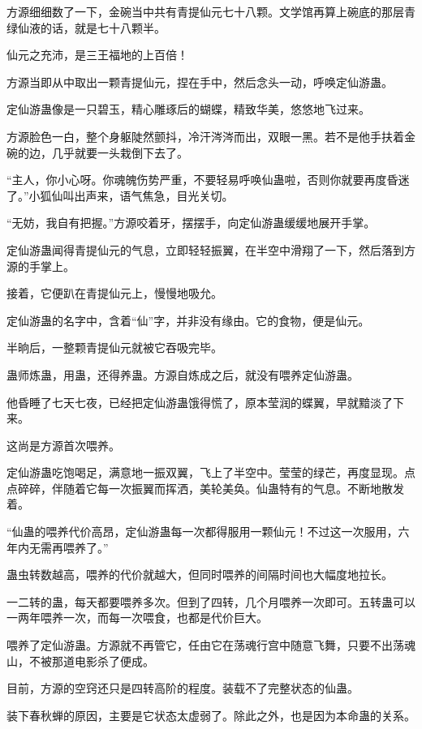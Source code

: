 
\begin{this_body}

方源细细数了一下，金碗当中共有青提仙元七十八颗。文学馆再算上碗底的那层青绿仙液的话，就是七十八颗半。

仙元之充沛，是三王福地的上百倍！

方源当即从中取出一颗青提仙元，捏在手中，然后念头一动，呼唤定仙游蛊。

定仙游蛊像是一只碧玉，精心雕琢后的蝴蝶，精致华美，悠悠地飞过来。

方源脸色一白，整个身躯陡然颤抖，冷汗涔涔而出，双眼一黑。若不是他手扶着金碗的边，几乎就要一头栽倒下去了。

“主人，你小心呀。你魂魄伤势严重，不要轻易呼唤仙蛊啦，否则你就要再度昏迷了。”小狐仙叫出声来，语气焦急，目光关切。

“无妨，我自有把握。”方源咬着牙，摆摆手，向定仙游蛊缓缓地展开手掌。

定仙游蛊闻得青提仙元的气息，立即轻轻振翼，在半空中滑翔了一下，然后落到方源的手掌上。

接着，它便趴在青提仙元上，慢慢地吸允。

定仙游蛊的名字中，含着“仙”字，并非没有缘由。它的食物，便是仙元。

半晌后，一整颗青提仙元就被它吞吸完毕。

蛊师炼蛊，用蛊，还得养蛊。方源自炼成之后，就没有喂养定仙游蛊。

他昏睡了七天七夜，已经把定仙游蛊饿得慌了，原本莹润的蝶翼，早就黯淡了下来。

这尚是方源首次喂养。

定仙游蛊吃饱喝足，满意地一振双翼，飞上了半空中。莹莹的绿芒，再度显现。点点碎碎，伴随着它每一次振翼而挥洒，美轮美奂。仙蛊特有的气息。不断地散发着。

“仙蛊的喂养代价高昂，定仙游蛊每一次都得服用一颗仙元！不过这一次服用，六年内无需再喂养了。”

蛊虫转数越高，喂养的代价就越大，但同时喂养的间隔时间也大幅度地拉长。

一二转的蛊，每天都要喂养多次。但到了四转，几个月喂养一次即可。五转蛊可以一两年喂养一次，而每一次喂食，也都是代价巨大。

喂养了定仙游蛊。方源就不再管它，任由它在荡魂行宫中随意飞舞，只要不出荡魂山，不被那道电影杀了便成。

目前，方源的空窍还只是四转高阶的程度。装载不了完整状态的仙蛊。

装下春秋蝉的原因，主要是它状态太虚弱了。除此之外，也是因为本命蛊的关系。


\end{this_body}
